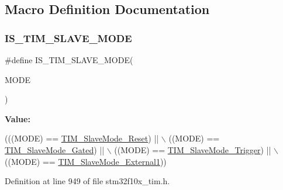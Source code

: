 \subsection{Macro Definition Documentation}
\mbox{\label{group___t_i_m___slave___mode_ga7f0e666bc968c56df7f1f6c2465c89fb}} 
\subsubsection{\texorpdfstring{I\+S\+\_\+\+T\+I\+M\+\_\+\+S\+L\+A\+V\+E\+\_\+\+M\+O\+DE}{IS\_TIM\_SLAVE\_MODE}}
{\footnotesize\ttfamily \#define I\+S\+\_\+\+T\+I\+M\+\_\+\+S\+L\+A\+V\+E\+\_\+\+M\+O\+DE(\begin{DoxyParamCaption}\item[{}]{M\+O\+DE }\end{DoxyParamCaption})}

{\bfseries Value\+:}
\begin{DoxyCode}
(((MODE) == \hyperlink{group___t_i_m___slave___mode_gaac1cec731f1a5e680a038c4f472f74af}{TIM\_SlaveMode\_Reset}) || \(\backslash\)
                                 ((MODE) == \hyperlink{group___t_i_m___slave___mode_ga1f36c870b926f70b32f274bbc0bc39a5}{TIM\_SlaveMode\_Gated}) || \(\backslash\)
                                 ((MODE) == \hyperlink{group___t_i_m___slave___mode_ga9e7726c04ee1bafec97226f08adf5677}{TIM\_SlaveMode\_Trigger}) || \(\backslash\)
                                 ((MODE) == \hyperlink{group___t_i_m___slave___mode_ga34427a693157ab177fead9871185bd35}{TIM\_SlaveMode\_External1}))
\end{DoxyCode}


Definition at line 949 of file stm32f10x\+\_\+tim.\+h.

\mbox{\label{group___t_i_m___slave___mode_ga34427a693157ab177fead9871185bd35}} 
